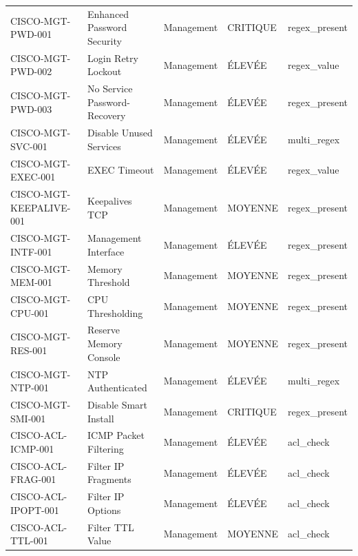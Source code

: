 \documentclass[12pt, a4paper]{report}
\begin{document}
\begin{longtable}{>{\small}p{3.8cm} >{\small}p{3cm} >{\small}p{2cm} >{\small}p{2cm} >{\small}p{2.5cm}}
  \rowcolor{tableRowA} CISCO-MGT-PWD-001 & Enhanced Password Security & Management & \textcolor{accentRed}{CRITIQUE} & regex\_present \\
  \rowcolor{tableRowB} CISCO-MGT-PWD-002 & Login Retry Lockout & Management & \textcolor{accentOrange}{ÉLEVÉE} & regex\_value \\
  \rowcolor{tableRowA} CISCO-MGT-PWD-003 & No Service Password-Recovery & Management & \textcolor{accentOrange}{ÉLEVÉE} & regex\_present \\
  \rowcolor{tableRowB} CISCO-MGT-SVC-001 & Disable Unused Services & Management & \textcolor{accentOrange}{ÉLEVÉE} & multi\_regex \\
  \rowcolor{tableRowA} CISCO-MGT-EXEC-001 & EXEC Timeout & Management & \textcolor{accentOrange}{ÉLEVÉE} & regex\_value \\
  \rowcolor{tableRowB} CISCO-MGT-KEEPALIVE-001 & Keepalives TCP & Management & \textcolor{accentGreen}{MOYENNE} & regex\_present \\
  \rowcolor{tableRowA} CISCO-MGT-INTF-001 & Management Interface & Management & \textcolor{accentOrange}{ÉLEVÉE} & regex\_present \\
  \rowcolor{tableRowB} CISCO-MGT-MEM-001 & Memory Threshold & Management & \textcolor{accentGreen}{MOYENNE} & regex\_present \\
  \rowcolor{tableRowA} CISCO-MGT-CPU-001 & CPU Thresholding & Management & \textcolor{accentGreen}{MOYENNE} & regex\_present \\
  \rowcolor{tableRowB} CISCO-MGT-RES-001 & Reserve Memory Console & Management & \textcolor{accentGreen}{MOYENNE} & regex\_present \\
  \rowcolor{tableRowA} CISCO-MGT-NTP-001 & NTP Authenticated & Management & \textcolor{accentOrange}{ÉLEVÉE} & multi\_regex \\
  \rowcolor{tableRowB} CISCO-MGT-SMI-001 & Disable Smart Install & Management & \textcolor{accentRed}{CRITIQUE} & regex\_present \\
  \rowcolor{tableRowA} CISCO-ACL-ICMP-001 & ICMP Packet Filtering & Management & \textcolor{accentOrange}{ÉLEVÉE} & acl\_check \\
  \rowcolor{tableRowB} CISCO-ACL-FRAG-001 & Filter IP Fragments & Management & \textcolor{accentOrange}{ÉLEVÉE} & acl\_check \\
  \rowcolor{tableRowA} CISCO-ACL-IPOPT-001 & Filter IP Options & Management & \textcolor{accentOrange}{ÉLEVÉE} & acl\_check \\
  \rowcolor{tableRowB} CISCO-ACL-TTL-001 & Filter TTL Value & Management & \textcolor{accentGreen}{MOYENNE} & acl\_check \\

\end{longtable}
\end{document}
